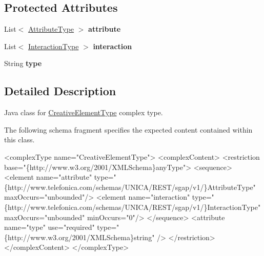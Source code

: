 \subsection*{Protected Attributes}
\begin{DoxyCompactItemize}
\item 
\hypertarget{classcom_1_1telefonica_1_1schemas_1_1unica_1_1rest_1_1sgap_1_1v1_1_1CreativeElementType_a5df0259f0027ac997f86e8bfdc9761d8}{
List$<$ \hyperlink{classcom_1_1telefonica_1_1schemas_1_1unica_1_1rest_1_1sgap_1_1v1_1_1AttributeType}{AttributeType} $>$ {\bfseries attribute}}
\label{classcom_1_1telefonica_1_1schemas_1_1unica_1_1rest_1_1sgap_1_1v1_1_1CreativeElementType_a5df0259f0027ac997f86e8bfdc9761d8}

\item 
\hypertarget{classcom_1_1telefonica_1_1schemas_1_1unica_1_1rest_1_1sgap_1_1v1_1_1CreativeElementType_addb396c20008fff1cd4392221c6db994}{
List$<$ \hyperlink{classcom_1_1telefonica_1_1schemas_1_1unica_1_1rest_1_1sgap_1_1v1_1_1InteractionType}{InteractionType} $>$ {\bfseries interaction}}
\label{classcom_1_1telefonica_1_1schemas_1_1unica_1_1rest_1_1sgap_1_1v1_1_1CreativeElementType_addb396c20008fff1cd4392221c6db994}

\item 
\hypertarget{classcom_1_1telefonica_1_1schemas_1_1unica_1_1rest_1_1sgap_1_1v1_1_1CreativeElementType_a90bd1dcfc5cc32a9dc2527d29774a23f}{
String {\bfseries type}}
\label{classcom_1_1telefonica_1_1schemas_1_1unica_1_1rest_1_1sgap_1_1v1_1_1CreativeElementType_a90bd1dcfc5cc32a9dc2527d29774a23f}

\end{DoxyCompactItemize}


\subsection{Detailed Description}
Java class for \hyperlink{classcom_1_1telefonica_1_1schemas_1_1unica_1_1rest_1_1sgap_1_1v1_1_1CreativeElementType}{CreativeElementType} complex type.

The following schema fragment specifies the expected content contained within this class.


\begin{DoxyPre}
 <complexType name="CreativeElementType">
   <complexContent>
     <restriction base="\{http://www.w3.org/2001/XMLSchema\}anyType">
       <sequence>
         <element name="attribute" type="\{http://www.telefonica.com/schemas/UNICA/REST/sgap/v1/\}AttributeType" maxOccurs="unbounded"/>
         <element name="interaction" type="\{http://www.telefonica.com/schemas/UNICA/REST/sgap/v1/\}InteractionType" maxOccurs="unbounded" minOccurs="0"/>
       </sequence>
       <attribute name="type" use="required" type="\{http://www.w3.org/2001/XMLSchema\}string" />
     </restriction>
   </complexContent>
 </complexType>
 \end{DoxyPre}
 

